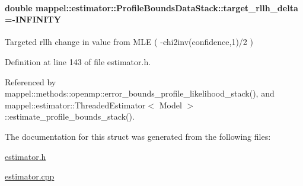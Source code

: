 \paragraph[{\texorpdfstring{target\+\_\+rllh\+\_\+delta}{target_rllh_delta}}]{\setlength{\rightskip}{0pt plus 5cm}double mappel\+::estimator\+::\+Profile\+Bounds\+Data\+Stack\+::target\+\_\+rllh\+\_\+delta =-\/I\+N\+F\+I\+N\+I\+TY}\hypertarget{structmappel_1_1estimator_1_1ProfileBoundsDataStack_a05d506b252e3e6ddc1a5036b60e8e854}{}\label{structmappel_1_1estimator_1_1ProfileBoundsDataStack_a05d506b252e3e6ddc1a5036b60e8e854}


Targeted rllh change in value from M\+LE ( -\/chi2inv(confidence,1)/2 ) 



Definition at line 143 of file estimator.\+h.



Referenced by mappel\+::methods\+::openmp\+::error\+\_\+bounds\+\_\+profile\+\_\+likelihood\+\_\+stack(), and mappel\+::estimator\+::\+Threaded\+Estimator$<$ Model $>$\+::estimate\+\_\+profile\+\_\+bounds\+\_\+stack().



The documentation for this struct was generated from the following files\+:\begin{DoxyCompactItemize}
\item 
\hyperlink{estimator_8h}{estimator.\+h}\item 
\hyperlink{estimator_8cpp}{estimator.\+cpp}\end{DoxyCompactItemize}

